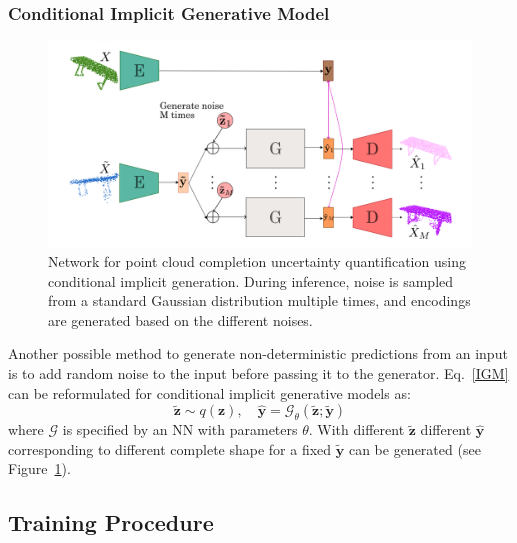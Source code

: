         \subsubsection{Conditional Implicit Generative Model}
        \begin{figure}[htb]
          \begin{center}
          \includegraphics[width=\linewidth]{figures/implicit_gen_network.png}
          \end{center}
          \caption{Network for point cloud completion uncertainty quantification using conditional implicit generation. During inference, noise is sampled from a standard Gaussian distribution multiple times, and encodings are generated based on the different noises.}\label{fig:implicit_net}
        \end{figure}
        Another possible method to generate non-deterministic predictions from an input is to add random noise to the input before passing it to the generator. Eq.~\ref{IGM} can be reformulated for conditional implicit generative models as:
        \begin{equation}\label{IGM}
            \mathbf{\tilde{z}} \sim q(\mathbf{z}), \quad \mathbf{\hat{y}} =  \mathcal{G}_\theta(\mathbf{\tilde{z}}; \mathbf{\tilde{y}})
        \end{equation}
        where $\mathcal{G}$ is specified by an NN with parameters $\theta$. With different $\mathbf{\tilde{z}}$ different $\mathbf{\hat{y}}$ corresponding to different complete shape for a fixed $\mathbf{\tilde{y}}$ can be generated (see Figure~\ref{fig:implicit_net}).

    \subsection{Training Procedure}
